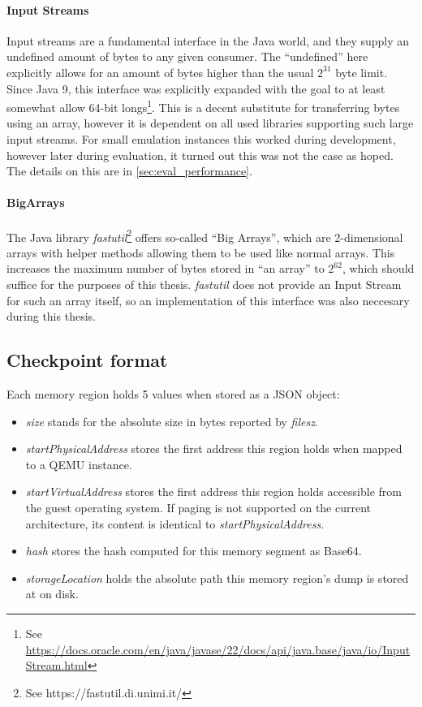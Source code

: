 \paragraph{Input Streams}
Input streams are a fundamental interface in the Java world,
and they supply an undefined amount of bytes to any given consumer.
The \enquote{undefined} here explicitly allows for an amount of bytes higher than the usual $2^{31}$ byte limit.
Since Java 9, this interface was explicitly expanded with the goal to at least somewhat allow 64-bit longs\footnote{See \href{https://docs.oracle.com/en/java/javase/22/docs/api/java.base/java/io/InputStream.html#transferTo(java.io.OutputStream)}{https://docs.oracle.com/en/java/javase/22/docs/api/java.base/java/io/InputStream.html}}.
This is a decent substitute for transferring bytes using an array,
however it is dependent on all used libraries supporting such large input streams.
For small emulation instances this worked during development,
however later during evaluation, it turned out this was not the case as hoped.
The details on this are in \autoref{sec:eval_performance}.

\paragraph{BigArrays}
The Java library \emph{fastutil}\footnote{See https://fastutil.di.unimi.it/} offers so-called \enquote{Big Arrays},
which are 2-dimensional arrays with helper methods allowing them to be used like normal arrays.
This increases the maximum number of bytes stored in \enquote{an array} to $2^{62}$,
which should suffice for the purposes of this thesis.
\emph{fastutil} does not provide an Input Stream for such an array itself,
so an implementation of this interface was also neccesary during this thesis.

\subsection{Checkpoint format}
Each memory region holds 5 values when stored as a JSON object:
\begin{itemize}
    \item \emph{size} stands for the absolute size in bytes reported by \emph{filesz}.
    \item \emph{startPhysicalAddress} stores the first address this region holds when mapped to a QEMU instance.
    \item \emph{startVirtualAddress} stores the first address this region holds accessible from the guest operating system.
    If paging is not supported on the current architecture, its content is identical to \emph{startPhysicalAddress}.
    \item \emph{hash} stores the hash computed for this memory segment as Base64.
    \item \emph{storageLocation} holds the absolute path this memory region's dump is stored at on disk.
\end{itemize}


